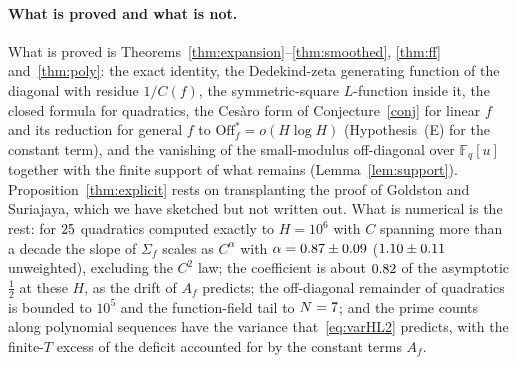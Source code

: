 \documentclass[11pt,a4paper]{article}
\theoremstyle{remark}\newtheorem{remark}[theorem]{Remark}
\newcommand{\F}{\mathbb{F}}
\begin{document}
\paragraph{What is proved and what is not.} What is proved is Theorems~\ref{thm:expansion}--\ref{thm:smoothed}, \ref{thm:ff} and~\ref{thm:poly}:
the exact identity, the Dedekind-zeta generating function of the diagonal with residue $1/C(f)$, the
symmetric-square $L$-function inside it, the closed formula for quadratics, the Ces\`aro form of
Conjecture~\ref{conj} for linear $f$ and its reduction for general $f$ to $\mathrm{Off}^\ast_f=o(H\log H)$
(Hypothesis~(E) for the constant term), and the vanishing of the small-modulus off-diagonal over
$\F_q[u]$ together with the finite support of what remains (Lemma~\ref{lem:support}). Proposition~\ref{thm:explicit} rests on transplanting the proof of Goldston and Suriajaya,
which we have sketched but not written out. What is numerical is the rest: for $25$ quadratics computed
exactly to $H=10^6$ with $C$ spanning more than a decade the slope of $\Sigma_f$ scales as
$C^{\alpha}$ with $\alpha=0.87\pm0.09$ ($1.10\pm0.11$ unweighted), excluding
the $C^2$ law; the coefficient is about $0.82$ of the
asymptotic $\tfrac12$ at these $H$, as the drift of $A_f$ predicts; the off-diagonal remainder of
quadratics is bounded to $10^5$ and the function-field tail to $N=7$; and the prime counts along
polynomial sequences have the variance that~\eqref{eq:varHL2} predicts, with the finite-$T$ excess of the
deficit accounted for by the constant terms $A_f$.
\end{document}
